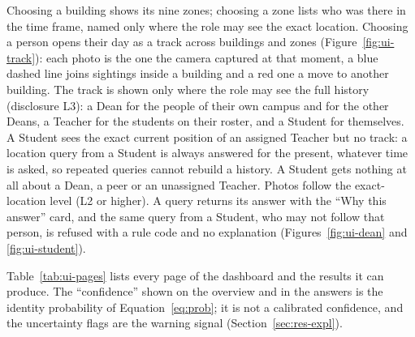 \documentclass[12pt,a4paper,oneside]{report}
\begin{document}
Choosing a building shows its nine zones; choosing a zone lists who was there in the time frame, named only where the role may see the exact location. Choosing a person opens their day as a track across buildings and zones (Figure~\ref{fig:ui-track}): each photo is the one the camera captured at that moment, a blue dashed line joins sightings inside a building and a red one a move to another building. The track is shown only where the role may see the full history (disclosure L3): a Dean for the people of their own campus and for the other Deans, a Teacher for the students on their roster, and a Student for themselves. A Student sees the exact current position of an assigned Teacher but no track: a location query from a Student is always answered for the present, whatever time is asked, so repeated queries cannot rebuild a history. A Student gets nothing at all about a Dean, a peer or an unassigned Teacher. Photos follow the exact-location level (L2 or higher). A query returns its answer with the ``Why this answer'' card, and the same query from a Student, who may not follow that person, is refused with a rule code and no explanation (Figures~\ref{fig:ui-dean} and \ref{fig:ui-student}).

Table~\ref{tab:ui-pages} lists every page of the dashboard and the results it can produce. The ``confidence'' shown on the overview and in the answers is the identity probability of Equation~\ref{eq:prob}; it is not a calibrated confidence, and the uncertainty flags are the warning signal (Section~\ref{sec:res-expl}).
\end{document}
